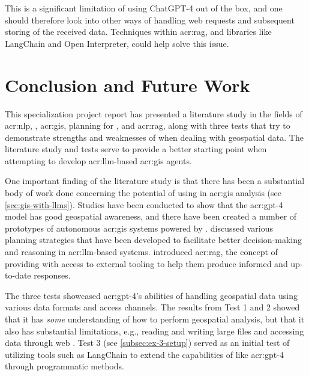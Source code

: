 This is a significant limitation of using ChatGPT-4 out of the box, and one should therefore look into other ways of handling web requests and subsequent storing of the received data. Techniques within \gls{acr:rag}, and libraries like LangChain and Open Interpreter, could help solve this issue.

\glsresetall

\section{Conclusion and Future Work}\label{sec:conclusion-and-future-work}

This specialization project report has presented a literature study in the fields of \acrlong{acr:nlp}, , \acrshort{acr:gis}, planning for , and \acrlong{acr:rag}, along with three tests that try to demonstrate strengths and weaknesses of  when dealing with geospatial data. The literature study and tests serve to provide a better starting point when attempting to develop \acrshort{acr:llm}-based \acrshort{acr:gis} agents.

One important finding of the literature study is that there has been a substantial body of work done concerning the potential of using  in \acrshort{acr:gis} analysis (see \autoref{sec:gis-with-llms}). Studies have been conducted to show that the \acrshort{acr:gpt}-4 model has good geospatial awareness, and there have been created a number of prototypes of autonomous \acrshort{acr:gis} systems powered by .  discussed various planning strategies that have been developed to facilitate better decision-making and reasoning in \acrshort{acr:llm}-based systems.  introduced \gls{acr:rag}, the concept of providing  with access to external tooling to help them produce informed and up-to-date responses.

The three tests showcased \acrshort{acr:gpt}-4's abilities of handling geospatial data using various data formats and access channels. The results from Test 1 and 2 showed that it has \textit{some} understanding of how to perform geospatial analysis, but that it also has substantial limitations, e.g., reading and writing large files and accessing data through web . Test 3 (see \autoref{subsec:ex-3-setup}) served as an initial test of utilizing tools such as LangChain to extend the capabilities of  like \acrshort{acr:gpt}-4 through programmatic methods.

